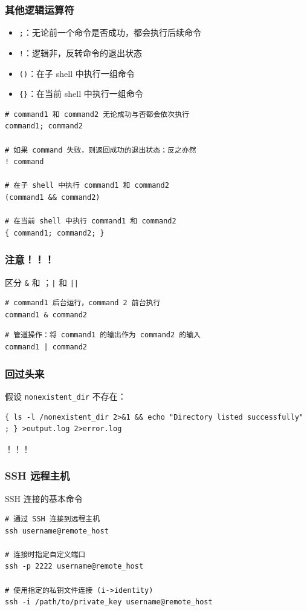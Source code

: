 \documentclass[UTF8, 16pt]{beamer}
\begin{document}
\begin{frame}[fragile]
    \frametitle{其他逻辑运算符}
    
    \begin{itemize}
        \item \texttt{;}：无论前一个命令是否成功，都会执行后续命令
        \item \texttt{!}：逻辑非，反转命令的退出状态
        \item \texttt{()}：在子 shell 中执行一组命令
        \item \texttt{\{\}}：在当前 shell 中执行一组命令
    \end{itemize}
    
    \begin{lstlisting}
# command1 和 command2 无论成功与否都会依次执行
command1; command2

# 如果 command 失败，则返回成功的退出状态；反之亦然
! command

# 在子 shell 中执行 command1 和 command2
(command1 && command2)

# 在当前 shell 中执行 command1 和 command2
{ command1; command2; }\end{lstlisting}
\end{frame}

\begin{frame}[fragile]
    \frametitle{注意！！！}
    \textcolor{sufered}{区分 \texttt{\&} 和 \text{\&\&}；\texttt{|} 和 \texttt{||}}
    
    \begin{lstlisting}
# command1 后台运行，command 2 前台执行
command1 & command2\end{lstlisting}
    \begin{lstlisting}
# 管道操作：将 command1 的输出作为 command2 的输入
command1 | command2\end{lstlisting}
\end{frame}

\begin{frame}[fragile]
    \frametitle{回过头来}
    \textcolor{sufered}{假设 \texttt{nonexistent\_dir} 不存在：}
    
    \begin{lstlisting}[numbers=none]
{ ls -l /nonexistent_dir 2>&1 && echo "Directory listed successfully" ; } >output.log 2>error.log\end{lstlisting}
    
    ！！！
\end{frame}

\begin{frame}[fragile]
    \frametitle{SSH 远程主机}
    \textcolor{sufered}{SSH 连接的基本命令}
    
    \begin{lstlisting}
# 通过 SSH 连接到远程主机
ssh username@remote_host

# 连接时指定自定义端口
ssh -p 2222 username@remote_host

# 使用指定的私钥文件连接 (i->identity)
ssh -i /path/to/private_key username@remote_host
    \end{lstlisting}
\end{frame}
\end{document}
